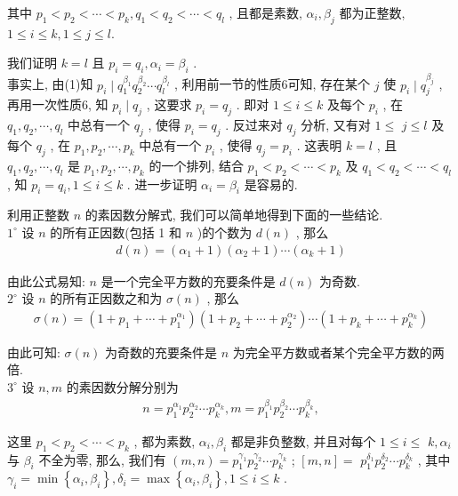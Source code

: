 其中 $p_{1}<p_{2}<\cdots<p_{k}, q_{1}<q_{2}<\cdots<q_{l}$ , 且都是素数,  $\alpha_{i} ,  \beta_{j}$ 都为正整数,  $1 \leqslant i \leqslant k, 1 \leqslant j \leqslant l$.

我们证明 $k=l$ 且 $p_{i}=q_{i}, \alpha_{i}=\beta_{i}$ . \\
事实上, 由(1)知 $p_{i} \mid q_{1}^{\beta_{1}} q_{2}^{\beta_{2}} \cdots q_{l}^{\beta_{l}}$ , 利用前一节的性质6可知, 存在某个 $j$ 使 $p_{i} \mid q_{j}^{\beta_{j}}$ , 再用一次性质6, 知 $p_{i} \mid q_{j}$ , 这要求 $p_{i}=q_{j}$ . 即对 $1 \leqslant i \leqslant k$ 及每个 $p_{i}$ , 在 $q_{1}, q_{2}, \cdots, q_{l}$ 中总有一个 $q_{j}$ , 使得 $p_{i}=q_{j}$ . 反过来对 $q_{j}$ 分析, 又有对 $1 \leqslant$ $j \leqslant l$ 及每个 $q_{j}$ , 在 $p_{1}, p_{2}, \cdots, p_{k}$ 中总有一个 $p_{i}$ , 使得 $q_{j}=p_{i}$ . 这表明 $k=l$ , 且 $q_{1}, q_{2}, \cdots, q_{l}$ 是 $p_{1}, p_{2}, \cdots, p_{k}$ 的一个排列, 结合 $p_{1}<p_{2}<\cdots<p_{k}$ 及 $q_{1}<q_{2}<\cdots<q_{l}$ , 知 $p_{i}=q_{i}, 1 \leqslant i \leqslant k$ . 进一步证明 $\alpha_{i}=\beta_{i}$ 是容易的.

利用正整数 $n$ 的素因数分解式, 我们可以简单地得到下面的一些结论. \\
$1^{\circ}$ 设 $n$ 的所有正因数(包括 1 和 $n$ )的个数为 $d(n)$ , 那么
\begin{align*}
	d(n)=\left(\alpha_{1}+1\right)\left(\alpha_{2}+1\right) \cdots\left(\alpha_{k}+1\right)
\end{align*}

由此公式易知: $n$ 是一个完全平方数的充要条件是 $d(n)$ 为奇数. \\
$2^{\circ}$ 设 $n$ 的所有正因数之和为 $\sigma(n)$ , 那么
\begin{align*}
	\sigma(n)=\left(1+p_{1}+\cdots+p_{1}^{\alpha_{1}}\right)\left(1+p_{2}+\cdots+p_{2}^{\alpha_{2}}\right) \cdots\left(1+p_{k}+\cdots+p_{k}^{\alpha_{k}}\right)
\end{align*}

由此可知:  $\sigma(n)$ 为奇数的充要条件是 $n$ 为完全平方数或者某个完全平方数的两倍. \\
$3^{\circ}$ 设 $n ,  m$ 的素因数分解分别为
\begin{align*}
	n=p_{1}^{\alpha_{1}} p_{2}^{\alpha_{2}} \cdots p_{k}^{\alpha_{k}}, m=p_{1}^{\beta_{1}} p_{2}^{\beta_{2}} \cdots p_{k}^{\beta_{k}},
\end{align*}

这里 $p_{1}<p_{2}<\cdots<p_{k}$ , 都为素数,  $\alpha_{i} ,  \beta_{i}$ 都是非负整数, 并且对每个 $1 \leqslant i \leqslant$ $k, \alpha_{i}$ 与 $\beta_{i}$ 不全为零, 那么, 我们有 $(m, n)=p_{1}^{\gamma_{1}} p_{2}^{\gamma_{2}} \cdots p_{k}^{\gamma_{k}}$ ;  $[m, n]=$ $p_{1}^{\delta_{1}} p_{2}^{\delta_{2}} \cdots p_{k}^{\delta_{k}}$ , 其中 $\gamma_{i}=\min \left\{\alpha_{i}, \beta_{i}\right\}, \delta_{i}=\max \left\{\alpha_{i}, \beta_{i}\right\}, 1 \leqslant i \leqslant k$ .


